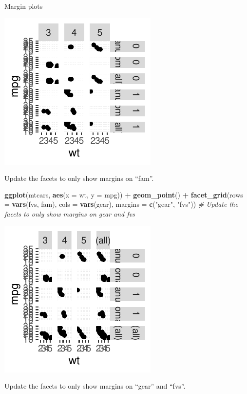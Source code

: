 \documentclass[
  ignorenonframetext,
]{beamer}
\newenvironment{Shaded}{\begin{snugshade}}{\end{snugshade}}
\newcommand{\AttributeTok}[1]{\textcolor[rgb]{0.13,0.29,0.53}{#1}}
\newcommand{\CommentTok}[1]{\textcolor[rgb]{0.56,0.35,0.01}{\textit{#1}}}
\newcommand{\FunctionTok}[1]{\textcolor[rgb]{0.13,0.29,0.53}{\textbf{#1}}}
\newcommand{\NormalTok}[1]{#1}
\newcommand{\SpecialCharTok}[1]{\textcolor[rgb]{0.81,0.36,0.00}{\textbf{#1}}}
\newcommand{\StringTok}[1]{\textcolor[rgb]{0.31,0.60,0.02}{#1}}
\begin{document}
\begin{frame}[fragile]{Margin plots}
\begin{center}\includegraphics[width=0.5\linewidth]{Figs/unnamed-chunk-100-1} \end{center}

Update the facets to only show margins on ``fam''.


\begin{Shaded}
\begin{Highlighting}[]
\FunctionTok{ggplot}\NormalTok{(mtcars, }\FunctionTok{aes}\NormalTok{(}\AttributeTok{x =}\NormalTok{ wt, }\AttributeTok{y =}\NormalTok{ mpg)) }\SpecialCharTok{+} \FunctionTok{geom\_point}\NormalTok{() }\SpecialCharTok{+} \FunctionTok{facet\_grid}\NormalTok{(}\AttributeTok{rows =} \FunctionTok{vars}\NormalTok{(fvs,}
\NormalTok{    fam), }\AttributeTok{cols =} \FunctionTok{vars}\NormalTok{(gear), }\AttributeTok{margins =} \FunctionTok{c}\NormalTok{(}\StringTok{"gear"}\NormalTok{, }\StringTok{"fvs"}\NormalTok{))  }\CommentTok{\# Update the facets to only show margins on gear and fvs}
\end{Highlighting}
\end{Shaded}

\begin{center}\includegraphics[width=0.5\linewidth]{Figs/unnamed-chunk-101-1} \end{center}

Update the facets to only show margins on ``gear'' and ``fvs''.
\end{frame}
\end{document}
